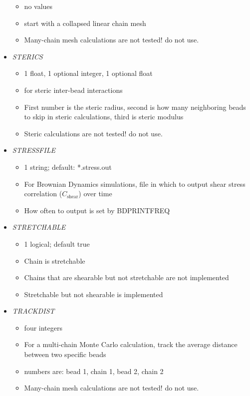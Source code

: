 \documentclass[12pt]{article}
\begin{document}
\begin{itemize}
\begin{itemize}
    \item no values
    \item start with a collapsed linear chain mesh
    \item {\color{red} Many-chain mesh calculations are not tested! do not use.}
   \end{itemize}
%
\item {\it STERICS}
  \begin{itemize}
    \item 1 float, 1 optional integer, 1 optional float
    \item  for steric inter-bead interactions
    \item First number is the steric radius, second is how many neighboring beads to skip in steric calculations, third is steric modulus
    \item {\color{red} Steric calculations are not tested! do not use.}
   \end{itemize}
%
\item {\it STRESSFILE}
  \begin{itemize}
    \item 1 string; default: *.stress.out
    \item For Brownian Dynamics simulations, file in which to output shear stress correlation ($C_\text{shear}$) over time
    \item How often to output is set by BDPRINTFREQ
   \end{itemize}
%
\item {\it STRETCHABLE}
  \begin{itemize}
    \item 1 logical; default true
    \item Chain is stretchable
    \item Chains that are shearable but not stretchable are not implemented
    \item Stretchable but not shearable is implemented
   \end{itemize}
%
\item {\it TRACKDIST}
  \begin{itemize}
    \item four integers
    \item For a multi-chain Monte Carlo calculation, track the average distance between two specific beads
    \item numbers are: bead 1, chain 1, bead 2, chain 2
    \item {\color{red} Many-chain mesh calculations are not tested! do not use.}
   \end{itemize}

\end{itemize}
\end{document}
